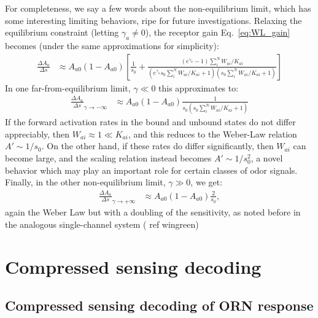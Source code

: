 \documentclass[9pt,twoside,lineno]{pnas-new}
\begin{document}
For completeness, we say a few words about the non-equilibrium limit, which has some interesting limiting behaviors, ripe for future investigations. Relaxing the equilibrium constraint (letting $\gamma_a \ne 0$), the receptor gain Eq.~\ref{eq:WL_gain} becomes (under the same approximations for simplicity):
\begin{align}
    \frac{\Delta A_a}{\Delta s} &\approx
    A_{a0}(1 - A_{a0})
    \left[
    \frac{1}{s_0}
    + \frac
        {(e^{\gamma_a} - 1)\sum_i^NW_{ai}/K_{ai}}
        {(e^{\gamma_a}s_0\sum_i^NW_{ai}/K_{ai} + 1)(s_0\sum_i^NW_{ai}/K_{ai} + 1)}
    \right]
\end{align}
In one far-from-equilibrium limit, $\gamma \ll 0$ this approximates to:
\begin{align}
    \frac{\Delta A_a}{\Delta s}_{\gamma \rightarrow -\infty} 
    &\approx
    A_{a0}(1 - A_{a0})
    \frac{1}{s_0(s_0\sum_i^NW_{ai}/K_{ai} + 1)}
\end{align}
If the forward activation rates in the bound and unbound states do not 
differ appreciably, then $W_{ai} \approx 1 \ll K_{ai}$, and this reduces to the Weber-Law relation $A' \sim 1/s_0$. On the other hand, if these rates do differ significantly, then $W_{ai}$ can become large, and the scaling relation instead becomes $A' \sim 1/s_0^2$, a novel behavior which may play an important role for certain classes of odor signals. 
Finally, in the other non-equilibrium limit, $\gamma \gg 0$, we get:
\begin{align}
    \frac{\Delta A_a}{\Delta s}_{\gamma \rightarrow +\infty} 
    &\approx
    A_{a0}(1 - A_{a0})
    \frac{2}{s_0},
\end{align}
again the Weber Law but with a doubling of the sensitivity, as noted before in the analogous single-channel system ({\color{blue} ref wingreen})
\fi





\section*{Compressed sensing decoding}

\subsection*{Compressed sensing decoding of ORN response}
\end{document}

